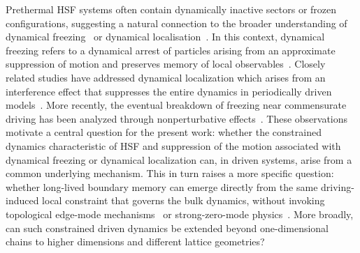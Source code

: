 \documentclass[aps,prb,reprint,twocolumn,amsmath,amssymb,citeautoscript]{revtex4-2}
\begin{document}
Prethermal HSF systems often contain dynamically inactive sectors or frozen configurations, suggesting a natural connection to the broader understanding of dynamical freezing~\cite{Das2010PRBFreezing,Bhattacharyya2012PRB} or dynamical localisation~\cite{AgarwalaSen2017PRB,MondalPekkerSengupta2012EPL}. In this context, dynamical freezing refers to a dynamical arrest of particles arising from an approximate suppression of motion and preserves memory of local observables~\cite{Das2010PRBFreezing,Bhattacharyya2012PRB,Hegde2014PRB,Haldar2021PRX,Haldar2024ThermoLimit}. Closely related studies have addressed dynamical localization which arises from an interference effect that suppresses the entire dynamics in periodically driven models~\cite{AgarwalaSen2017PRB,MondalPekkerSengupta2012EPL,NagRoyDuttaSen2014PRB,NandySenguptaSen2018JPhysA,MakkiBandyopadhyayMaityDutta2022PRB,AdityaSen2023SciPostCore}. More recently, the eventual breakdown of freezing near commensurate driving has been analyzed through nonperturbative effects~\cite{MukherjeeGuoChowdhury2026PRX,LongCrowleyKhemaniChandran2023PRL}. These observations motivate a central question for the present work: whether the constrained dynamics characteristic of HSF and suppression of the motion associated with dynamical freezing or dynamical localization can, in driven systems, arise from a common underlying mechanism. This in turn raises a more specific question: whether long-lived boundary memory can emerge directly from the same driving-induced local constraint that governs the bulk dynamics, without invoking topological edge-mode mechanisms~\cite{ElseNayak2016PRB,HarperRoyRudnerSondhi2020ARCMP,ParkerVasseurScaffidi2019PRL} or strong-zero-mode physics~\cite{ElseFendleyKempNayak2017PRX,KempYaoLaumann2020PRL,YatesMitra2022CommunPhys}. More broadly, can such constrained driven dynamics be extended beyond one-dimensional chains to higher dimensions and different lattice geometries?
\end{document}
